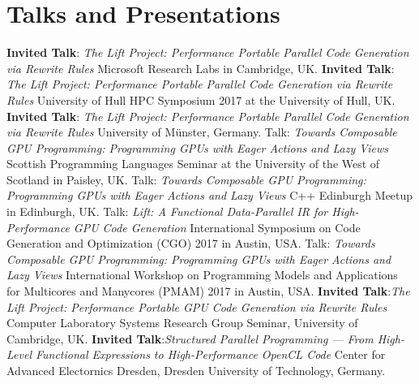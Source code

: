 \documentclass[11pt,a4paper]{moderncv}
\begin{document}
\section{Talks and Presentations}
         {\textbf{Invited Talk}:\newline
          \emph{The Lift Project: Performance Portable Parallel Code Generation via Rewrite Rules}\newline
         \small Microsoft Research Labs in Cambridge, UK.}
         {\textbf{Invited Talk}:\newline
          \emph{The Lift Project: Performance Portable Parallel Code Generation via Rewrite Rules}\newline
         \small University of Hull HPC Symposium 2017 at the University of Hull, UK.}
         {\textbf{Invited Talk}:\newline
          \emph{The Lift Project: Performance Portable Parallel Code Generation via Rewrite Rules}\newline
         \small University of Münster, Germany.}
         {Talk: \emph{Towards Composable GPU Programming: Programming GPUs with Eager Actions and Lazy Views}\newline
         \small Scottish Programming Languages Seminar at the University of the West of Scotland in Paisley, UK.}
         {Talk: \emph{Towards Composable GPU Programming: Programming GPUs with Eager Actions and Lazy Views}\newline
         \small C++ Edinburgh Meetup in Edinburgh, UK.}
         {Talk: \emph{Lift: A Functional Data-Parallel IR for High-Performance GPU Code Generation}\newline
          \small International Symposium on Code Generation and Optimization (CGO) 2017 in Austin, USA.}
         {Talk: \emph{Towards Composable GPU Programming: Programming GPUs with Eager Actions and Lazy Views}\newline
          \small  International Workshop on Programming Models and Applications for Multicores and Manycores (PMAM) 2017 in Austin, USA.}
         {\textbf{Invited Talk}:\newline \emph{The Lift Project: Performance Portable GPU Code Generation via Rewrite Rules}\newline
         Computer Laboratory Systems Research Group Seminar, University of Cambridge, UK.
         }
         {\textbf{Invited Talk}:\newline \emph{Structured Parallel Programming --- From High-Level Functional Expressions to High-Performance OpenCL Code}\newline
         Center for Advanced Electornics Dresden, Dresden University of Technology, Germany.
         }
\end{document}
